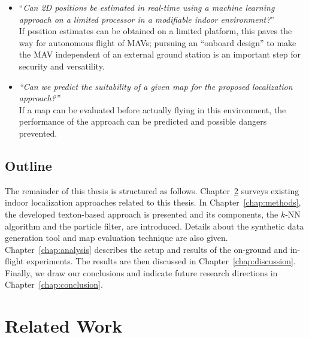 \documentclass{report}
\begin{document}
\begin{itemize}
\item ``\emph{Can 2D positions be estimated in real-time using a
    machine learning approach on a limited processor in a modifiable
    indoor
    environment?}''  \vspace*{0.15cm}\\
  If position estimates can be obtained on a limited platform, this
  paves the way for autonomous flight of MAVs; pursuing an ``onboard
  design'' to make the MAV independent of an external ground station
  is an important step for security and versatility.
\item \emph{``Can we predict the suitability of a given map for the proposed
  localization approach?''}  \vspace*{0.15cm}\\
  If a map can be evaluated before actually flying in this
  environment, the performance of the approach can be predicted and
  possible dangers prevented.
\end{itemize}

\section{Outline}
\label{sec:outline}

The remainder of this thesis is structured as follows.
Chapter~\ref{chap:relatedwork} surveys existing indoor localization
approaches related to this thesis. In Chapter~\ref{chap:methods}, the
developed texton-based approach is presented and its components, the
$k$-NN algorithm and the particle filter, are introduced. Details about
the synthetic data generation tool and map evaluation technique are
also given. Chapter~\ref{chap:analysis} describes the setup and
results of the on-ground and in-flight experiments. The results are
then discussed in Chapter~\ref{chap:discussion}. Finally, we draw our
conclusions and indicate future research directions in
Chapter~\ref{chap:conclusion}.

\chapter{Related Work}
\label{chap:relatedwork}
\end{document}

